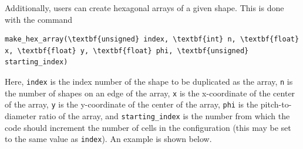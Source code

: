 \documentclass[twoside,a4paper]{refart}
\begin{document}
Additionally, users can create hexagonal arrays of a given shape. This is done with the command

\begin{verbatim}
make_hex_array(\textbf{unsigned} index, \textbf{int} n, \textbf{float} x, \textbf{float} y, \textbf{float} phi, \textbf{unsigned} starting_index)
\end{verbatim}

Here, \texttt{index} is the index number of the shape to be duplicated as the array, \texttt{n} is the 
number of shapes on an edge of the array, \texttt{x} is the x-coordinate of the center of the array,
\texttt{y} is the y-coordinate of the center of the array, \texttt{phi} is the pitch-to-diameter ratio 
of the array, and \texttt{starting\_index} is the number from which the code should increment the number
of cells in the configuration (this may be set to the same value as \texttt{index}). An example is shown
below.

\printindex
\end{document}
